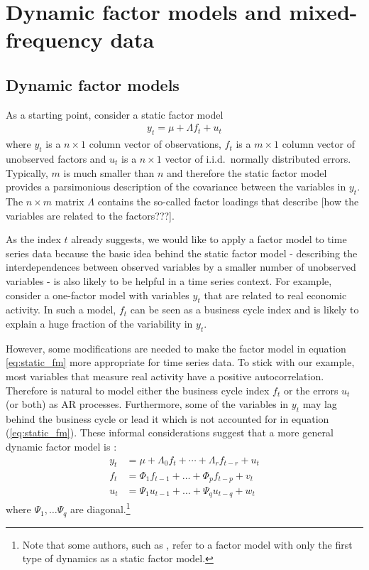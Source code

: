 \chapter{Dynamic factor models and mixed-frequency data}\label{sec:dfm}

\section{Dynamic factor models}



As a starting point, consider a static factor model
\begin{align}
y_t = \mu + \Lambda f_t + u_t \label{eq:static_fm}
\end{align}
where $y_t$ is a $n \times 1$ column vector of observations, $f_t$ is a $m \times 1$ column vector of unobserved factors and $u_t$ is a $n \times 1$ vector of i.i.d.~normally distributed errors. Typically, $m$ is much smaller than $n$ and therefore the static factor model provides a parsimonious description of the covariance between the variables in $y_t$. The $n \times m$ matrix $\Lambda$ contains the so-called factor loadings that describe [how the variables are related to the factors???]. %

As the index $t$ already suggests, we would like to apply a factor model to time series data because the basic idea behind the static factor model - describing the interdependences between observed variables by a smaller number of unobserved variables - is also likely to be helpful in a time series context. For example, consider a one-factor model with variables $y_t$ that are related to real economic activity. In such a model, $f_t$ can be seen as a business cycle index and is likely to explain a huge fraction of the variability in $y_t$. 

However, some modifications are needed to make the factor model in equation \ref{eq:static_fm} more appropriate for time series data. To stick with our example, most variables that measure real activity have a positive autocorrelation. Therefore is natural to model either the business cycle index $f_t$ or the errors $u_t$ (or both) as AR processes. Furthermore, some of the variables in $y_t$ may lag behind the business cycle or lead it which is not accounted for in equation (\ref{eq:static_fm}). These informal considerations suggest that a more general dynamic factor model is \citep{BaiWang2015}: 
\begin{align}
y_t &= \mu + \Lambda_0 f_t + \cdots + \Lambda_{r} f_{t-r} + u_t \\
f_t &= \Phi_1 f_{t-1} + \dots + \Phi_p f_{t-p} + v_t   \\
u_{t} &= \Psi_{1} u_{t-1} + \dots + \Psi_{q} u_{t-q} + w_{t}   
\end{align}
where $\Psi_1, \dots \Psi_q$ are diagonal.\footnote{
	Note that some authors, such as \citet{BaiWang2015}, refer to a factor model with only the first type of dynamics as a static factor model.
}\\ %

